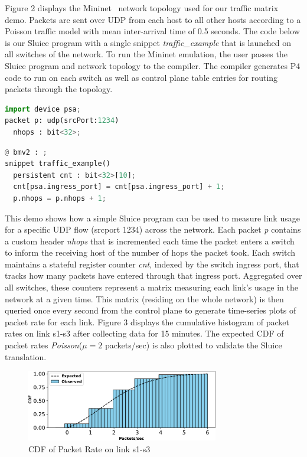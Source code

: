 Figure 2 displays the Mininet~\cite{mininet} network topology used for our traffic matrix demo.
Packets are sent over UDP from each host to all other hosts according to a
Poisson traffic model with mean inter-arrival time of 0.5 seconds. The code
below is our Sluice program with a single snippet \textit{traffic\_example}
that is launched on all switches of the network. To run the Mininet emulation, the
user passes the Sluice program and network topology to the compiler. The
compiler generates P4 code to run on each switch as well as control plane table entries for routing packets through the topology.
\vspace{-0.05in}
\begin{lstlisting}[language=Python, basicstyle=\scriptsize]
import device psa;
packet p: udp(srcPort:1234)
  nhops : bit<32>;
\end{lstlisting}
\vspace{-0.05in}
\begin{lstlisting}[language=Python, basicstyle=\scriptsize]
@ bmv2 : ;
snippet traffic_example()
  persistent cnt : bit<32>[10];
  cnt[psa.ingress_port] = cnt[psa.ingress_port] + 1;
  p.nhops = p.nhops + 1;
\end{lstlisting}
\vspace{-0.05in}
This demo shows how a simple Sluice program can be used to measure link usage for a specific UDP flow (srcport 1234) across the network. Each packet \textit{p} contains a custom header \textit{nhops}
that is incremented each time the packet enters a switch to inform the
receiving host of the number of hops the packet took. Each switch maintains a
stateful register counter \textit{cnt}, indexed by the switch ingress port, that
tracks how many packets have entered through that ingress port. Aggregated over all switches, these counters represent a matrix measuring each link's
usage in the network at a given time. This matrix (residing on the whole
network) is then queried once every second from the control plane to generate
time-series plots of packet rate for each link. Figure 3 displays the cumulative histogram of packet rates on link s1-s3 after collecting data for 15 minutes. The expected CDF of packet rates \textit{Poisson}($\mu = 2$
packets/sec) is also plotted to validate the Sluice translation.

\begin{figure}[tp]
\centering
\includegraphics[width=84mm,scale=0.7]{figures/exp_obs_cdf}
\vspace{-0.15in}
\caption{CDF of Packet Rate on link s1-s3}
\vspace{-0.15in}
\end{figure}

